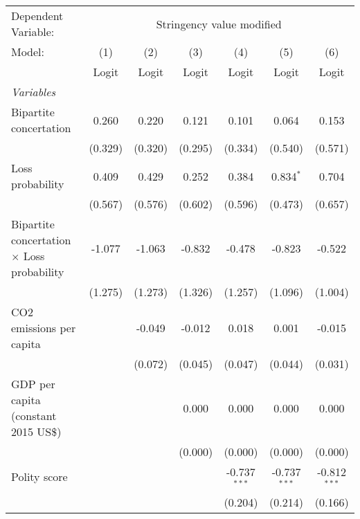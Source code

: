 
\begingroup
\centering
\begin{tabular}{lcccccc}
   \toprule
   Dependent Variable: & \multicolumn{6}{c}{Stringency value modified}\\
   Model:                                            & (1)     & (2)     & (3)     & (4)            & (5)            & (6)\\  
                                                     &  Logit  & Logit   & Logit   & Logit          & Logit          & Logit\\  
   \midrule
   \emph{Variables}\\
   Bipartite concertation                            & 0.260   & 0.220   & 0.121   & 0.101          & 0.064          & 0.153\\   
                                                     & (0.329) & (0.320) & (0.295) & (0.334)        & (0.540)        & (0.571)\\   
   Loss probability                                  & 0.409   & 0.429   & 0.252   & 0.384          & 0.834$^{*}$    & 0.704\\   
                                                     & (0.567) & (0.576) & (0.602) & (0.596)        & (0.473)        & (0.657)\\   
   Bipartite concertation $\times$ Loss probability  & -1.077  & -1.063  & -0.832  & -0.478         & -0.823         & -0.522\\   
                                                     & (1.275) & (1.273) & (1.326) & (1.257)        & (1.096)        & (1.004)\\   
   CO2 emissions per capita                          &         & -0.049  & -0.012  & 0.018          & 0.001          & -0.015\\   
                                                     &         & (0.072) & (0.045) & (0.047)        & (0.044)        & (0.031)\\   
   GDP per capita (constant 2015 US\$)               &         &         & 0.000   & 0.000          & 0.000          & 0.000\\   
                                                     &         &         & (0.000) & (0.000)        & (0.000)        & (0.000)\\   
   Polity score                                      &         &         &         & -0.737$^{***}$ & -0.737$^{***}$ & -0.812$^{***}$\\   
                                                     &         &         &         & (0.204)        & (0.214)        & (0.166)\\   

\end{tabular}
